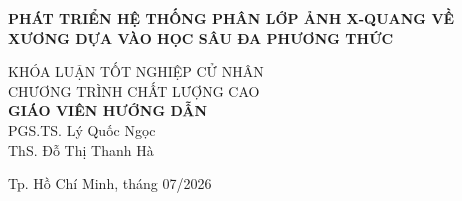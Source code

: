\begin{titlepage}
\begin{center}
{ \Large \bfseries PHÁT TRIỂN HỆ THỐNG PHÂN LỚP ẢNH X-QUANG VỀ XƯƠNG DỰA VÀO HỌC SÂU ĐA PHƯƠNG THỨC\\[2cm] } 


\large KHÓA LUẬN TỐT NGHIỆP CỬ NHÂN\\
\large CHƯƠNG TRÌNH CHẤT LƯỢNG CAO\\[2cm]

\textbf{GIÁO VIÊN HƯỚNG DẪN}\\
PGS.TS. Lý Quốc Ngọc\\
ThS. Đỗ Thị Thanh Hà 


\vfill
Tp. Hồ Chí Minh, tháng 07/2026

\end{center}

\end{titlepage}